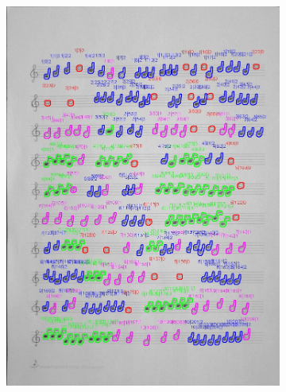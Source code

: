\documentclass[11pt]{article}
\begin{document}
\begin{figure}[H]
\begin{subfigure}{.5\textwidth}
        \includegraphics[width=\linewidth]{5_cnts.jpg}
        \label{fig:sub2}
    \end{subfigure}
    \label{fig:test}
\end{figure}
\end{document}
